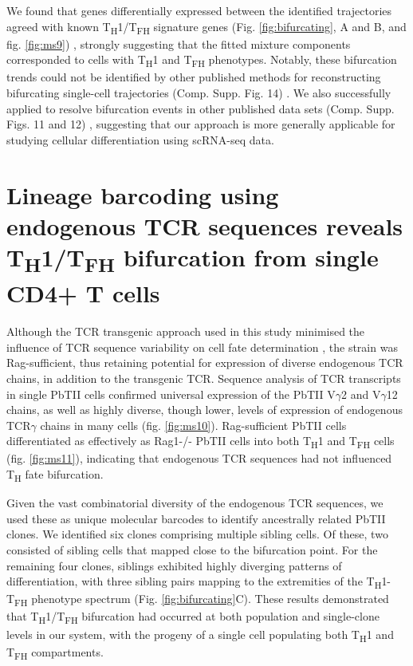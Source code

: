 We found that genes differentially expressed between the identified trajectories agreed with known T\textsubscript{H}1/T\textsubscript{FH} signature genes (Fig. \ref{fig:bifurcating}, A and B, and fig. \ref{fig:ms9}) \cite{Hale2013-yb}, strongly suggesting that the fitted mixture components corresponded to cells with T\textsubscript{H}1 and T\textsubscript{FH} phenotypes. Notably, these bifurcation trends could not be identified by other published methods for reconstructing bifurcating single-cell trajectories (Comp. Supp. Fig. 14) \cite{Marco2014-rf, Trapnell2014-cn, Chen2016-ar, Haghverdi2016-tm, Setty2016-ie}. We also successfully applied  to resolve bifurcation events in other published data sets (Comp. Supp. Figs. 11 and 12) \cite{Treutlein2014-rz, Guo2015-ao}, suggesting that our approach is more generally applicable for studying cellular differentiation using scRNA-seq data.

\section{Lineage barcoding using endogenous TCR sequences reveals \texorpdfstring{T\textsubscript{H}1/T\textsubscript{FH}}{TH1/TFH} bifurcation from single CD4+ T cells}

Although the TCR transgenic approach used in this study minimised the influence of TCR sequence variability on cell fate determination \cite{Tubo2013-zg}, the strain was Rag-sufficient, thus retaining potential for expression of diverse endogenous TCR chains, in addition to the transgenic TCR. Sequence analysis of TCR transcripts in single PbTII cells confirmed universal expression of the PbTII V\( \gamma \)2 and V\( \gamma \)12 chains, as well as highly diverse, though lower, levels of expression of endogenous TCR\( \gamma \) chains in many cells (fig. \ref{fig:ms10}). Rag-sufficient PbTII cells differentiated as effectively as Rag1-/- PbTII cells into both T\textsubscript{H}1 and T\textsubscript{FH} cells (fig. \ref{fig:ms11}), indicating that endogenous TCR sequences had not influenced T\textsubscript{H} fate bifurcation.

Given the vast combinatorial diversity of the endogenous TCR sequences, we used these as unique molecular barcodes to identify ancestrally related PbTII clones. We identified six clones comprising multiple sibling cells. Of these, two consisted of sibling cells that mapped close to the bifurcation point. For the remaining four clones, siblings exhibited highly diverging patterns of differentiation, with three sibling pairs mapping to the extremities of the T\textsubscript{H}1-T\textsubscript{FH} phenotype spectrum (Fig. \ref{fig:bifurcating}C). These results demonstrated that T\textsubscript{H}1/T\textsubscript{FH} bifurcation had occurred at both population and single-clone levels in our system, with the progeny of a single cell populating both T\textsubscript{H}1 and T\textsubscript{FH} compartments.

